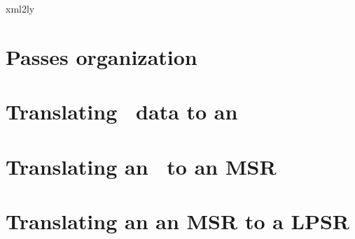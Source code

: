 \documentclass[12pt,a4paper]{article}
\begin{document}
\section{\xmlToLy\ }

{xml2ly}


\section{Passes organization}


\section{Translating \mxml\ data to an \mxmlt}


\section{Translating an \mxmlt\ to an MSR}


\section{Translating an an MSR to a LPSR}
\end{document}
